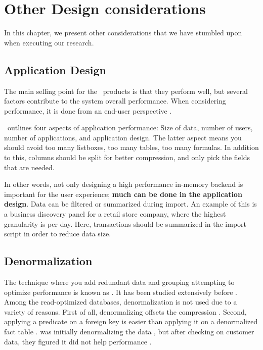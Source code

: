 \chapter{Other Design considerations}
\label{chap:Other Design considerations}
In this chapter, we present other considerations that we have stumbled upon when executing our research.
\newpage

\section{Application Design}
\label{sec:Application Design}
The main selling point for the \bd~products is that they perform well, but several factors contribute to the system overall performance. When considering performance, it is done from an end-user perspective \cite{Qlik2011-yc}.

\qlikview~outlines four aspects of application performance: Size of data, number of users, number of applications, and application design. The latter aspect means you should avoid too many listboxes, too many tables, too many formulas. In addition to this, columns should be split for better compression, and only pick the fields that are needed.

In other words, not only designing a high performance in-memory backend is important for the user experience; \textbf{much can be done in the application design}. Data can be filtered or summarized during import. An example of this is a business discovery panel for a retail store company, where the highest granularity is per day. Here, transactions should be summarized in the import script in order to reduce data size.

\section{Denormalization}
\label{sec:Denormalization}
The technique where you add redundant data and grouping attempting to optimize performance is known as  \cite{Wikipedia_contributors2015-az}. It has been studied extensively before \cite{Raman2008-gi}. Among the read-optimized databases, denormalization is not used due to a variety of reasons. First of all, denormalizing offsets the compression \cite{Barber2012-xt}. Second, applying a predicate on a foreign key is easier than applying it on a denormalized fact table \cite{Abadi2008-dd}. \blink was initially denormalizing the data \cite{Johnson2008-cp}, but after checking on customer data, they figured it did not help performance \cite{Barber2012-xt}.

